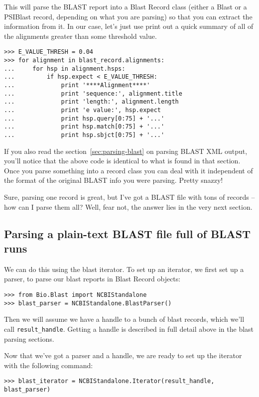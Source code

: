 \documentclass{report}
\begin{document}
This will parse the BLAST report into a Blast Record class (either a Blast or a PSIBlast record, depending on what you are parsing) so that you can extract the information from it. In our case, let's just use print out a quick summary of all of the alignments greater than some threshold value.

\begin{verbatim}
>>> E_VALUE_THRESH = 0.04
>>> for alignment in blast_record.alignments:
...     for hsp in alignment.hsps:
...         if hsp.expect < E_VALUE_THRESH:
...             print '****Alignment****'
...             print 'sequence:', alignment.title
...             print 'length:', alignment.length
...             print 'e value:', hsp.expect
...             print hsp.query[0:75] + '...'
...             print hsp.match[0:75] + '...'
...             print hsp.sbjct[0:75] + '...'
\end{verbatim}

If you also read the section~\ref{sec:parsing-blast} on parsing BLAST XML output, you'll notice that the above code is identical to what is found in that section. Once you parse something into a record class you can deal with it independent of the format of the original BLAST info you were parsing. Pretty snazzy!

Sure, parsing one record is great, but I've got a BLAST file with tons of records -- how can I parse them all? Well, fear not, the answer lies in the very next section.

\subsection{Parsing a plain-text BLAST file full of BLAST runs}

We can do this using the blast iterator. To set up an iterator, we first set up a parser, to parse our blast reports in Blast Record objects:

\begin{verbatim}
>>> from Bio.Blast import NCBIStandalone
>>> blast_parser = NCBIStandalone.BlastParser()
\end{verbatim}

Then we will assume we have a handle to a bunch of blast records, which we'll call \verb|result_handle|. Getting a handle is described in full detail above in the blast parsing sections.

Now that we've got a parser and a handle, we are ready to set up the iterator with the following command:

\begin{verbatim}
>>> blast_iterator = NCBIStandalone.Iterator(result_handle, blast_parser)
\end{verbatim}
\end{document}
